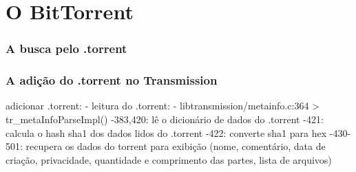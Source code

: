 \chapter{O BitTorrent}

\subsection{A busca pelo .torrent}

\subsection{A adição do .torrent no Transmission}

adicionar .torrent:
- leitura do .torrent:
	- libtransmission/metainfo.c:364 > tr_metaInfoParseImpl()
		-383,420: lê o dicionário de dados do .torrent
		-421: calcula o hash sha1 dos dados lidos do .torrent
		-422: converte sha1 para hex
		-430-501: recupera os dados do torrent para exibição (nome, comentário, data de criação,
		privacidade, quantidade e comprimento das partes, lista de arquivos)

		
